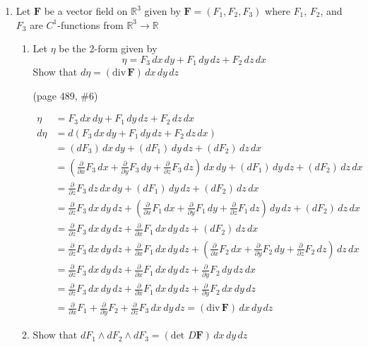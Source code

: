 \documentclass{article}
\newcommand{\parti}[1]{\frac{\partial}{\partial #1}}
\newcommand{\divt}{\text{div} \,}
\begin{document}
\thispagestyle{fancy}
\begin{enumerate}
    \item Let $\boldsymbol F$ be a vector field on $\mathbb{R}^3$ given by $\boldsymbol F = (F_1, F_2, F_3)$ where $F_1$, $F_2$, and $F_3$ are $C^1$-functions from $\mathbb{R}^3 \rightarrow \mathbb{R}$
    \begin{enumerate}
        \item Let $\eta$ be the 2-form given by
            \[ \eta = F_3 \, dx \, dy + F_1 \, dy \, dz + F_2 \, dz \, dx \]
            Show that $d\eta = (\divt \boldsymbol F) \, dx \, dy \, dz$
            
            (page 489, \#6)

            \begin{align*} 
                \eta &= F_3 \, dx \, dy + F_1 \, dy \, dz + F_2 \, dz \, dx \\
                d\eta &= d(F_3 \, dx \, dy + F_1 \, dy \, dz + F_2 \, dz \, dx) \\
                &= (dF_3)\, dx \, dy + (dF_1) \, dy \, dz + (dF_2) \, dz \, dx \\
                &= (\parti{x} F_3 \,dx + \parti{y} F_3 \, dy + \parti{z} F_3  \, dz)\, dx \, dy + (dF_1) \, dy \, dz + (dF_2) \, dz \, dx \\
                &= \parti{z} F_3  \, dz \, dx \, dy + (dF_1) \, dy \, dz + (dF_2) \, dz \, dx \\
                &= \parti{z} F_3  \, dx \, dy \, dz + (\parti{x} F_1 \,dx + \parti{y} F_1 \, dy + \parti{z} F_1  \, dz) \, dy \, dz + (dF_2) \, dz \, dx \\
                &= \parti{z} F_3  \, dx \, dy \, dz + \parti{x} F_1 \,dx \, dy \, dz + (dF_2) \, dz \, dx \\
                &= \parti{z} F_3  \, dx \, dy \, dz + \parti{x} F_1 \,dx \, dy \, dz + (\parti{x} F_2 \,dx + \parti{y} F_2 \, dy + \parti{z} F_2  \, dz) \, dz \, dx \\
                &= \parti{z} F_3  \, dx \, dy \, dz + \parti{x} F_1 \,dx \, dy \, dz + \parti{y} F_2 \, dy \, dz \, dx \\
                &= \parti{z} F_3  \, dx \, dy \, dz + \parti{x} F_1 \,dx \, dy \, dz + \parti{y} F_2 \, dx \, dy \, dz \\
                &= \parti{x} F_1 + \parti{y} F_2 + \parti{z} F_3 \, dx \, dy \, dz = (\divt \boldsymbol F) \, dx \, dy \, dz
            \end{align*} 
        \newpage
        \item Show that $dF_1 \wedge dF_2 \wedge dF_3 = (\text{det } D \boldsymbol F ) \, dx \, dy \, dz$

\end{enumerate}
\end{enumerate}
\end{document}
